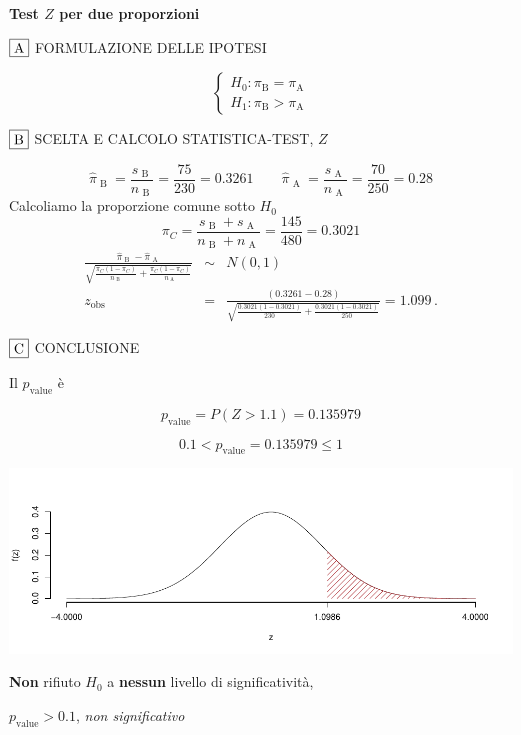 \documentclass[
  11pt,
]{book}
\theoremstyle{mytheoremstyle}
\theoremstyle{mydefstyle}
\newenvironment{sol}
  {
  \begin{tcolorbox}[enhanced,breakable,arc=0.1mm,boxrule=1pt,colback=white,colframe=iblue,
  title=\bf \fontfamily{lmss}\selectfont \hspace{.5 cm} Soluzione,drop fuzzy shadow]

}{
\end{tcolorbox}
  }
\begin{document}
\begin{sol}
\textbf{Test \(Z\) per due proporzioni}

\(\fbox{A}\) FORMULAZIONE DELLE IPOTESI

\[\begin{cases}
   H_0: \pi_\text{B} = \pi_\text{A} \\
   H_1: \pi_\text{B} > \pi_\text{A} 
   \end{cases}\]

\(\fbox{B}\) SCELTA E CALCOLO STATISTICA-TEST, \(Z\)

\[\hat\pi_\text{ B }=\frac{s_\text{ B }}{n_\text{ B }}=\frac{ 75 }{ 230 }= 0.3261 \qquad
   \hat\pi_\text{ A }=\frac{s_\text{ A }}{n_\text{ A }}=\frac{ 70 }{ 250 }= 0.28 \]Calcoliamo la proporzione comune sotto \(H_0\)
\[
     \pi_C=\frac{s_\text{ B }+s_\text{ A }}{n_\text{ B }+n_\text{ A }}=
     \frac{ 145 }{ 480 }= 0.3021 
   \]\begin{eqnarray*}
   \frac{\hat\pi_\text{ B } - \hat\pi_\text{ A }}
   {\sqrt{\frac {\pi_C(1-\pi_C)}{n_\text{ B }}+\frac {\pi_C(1-\pi_C)}{n_\text{ A }}}}&\sim&N(0,1)\\
   z_{\text{obs}}
   &=& \frac{ ( 0.3261 -  0.28 )} {\sqrt{\frac{ 0.3021 (1- 0.3021 )}{ 230 }+\frac{ 0.3021 (1- 0.3021 )}{ 250 }}}
   =   1.099 \, .
   \end{eqnarray*}

\(\fbox{C}\) CONCLUSIONE

Il \(p_{\text{value}}\) è

\[ p_{\text{value}} = P(Z>1.1)=0.135979 \]

\[
 0.1 < p_\text{value}= 0.135979 \leq 1 
\]

\begin{center}\includegraphics{Esami_passati_con_soluzioni_files/figure-latex/2023-61,-1} \end{center}

\textbf{Non} rifiuto \(H_0\) a \textbf{nessun}
livello di significatività,

\(p_\text{value}>0.1\),
\emph{non significativo}

\end{sol}
\end{document}
